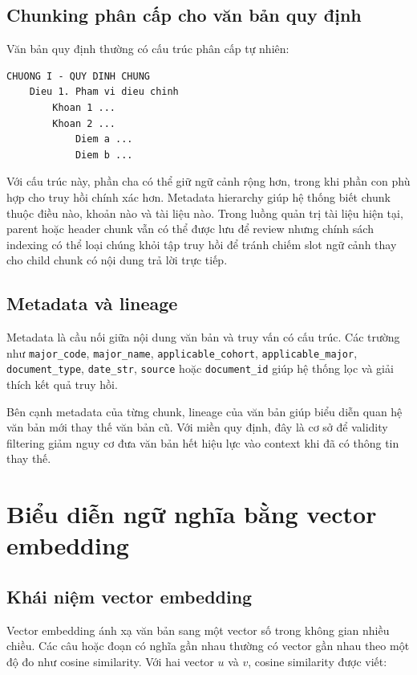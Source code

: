 \documentclass[../DoAn.tex]{subfiles}
\begin{document}
\subsection{Chunking phân cấp cho văn bản quy định}

Văn bản quy định thường có cấu trúc phân cấp tự nhiên:

\begin{verbatim}
CHUONG I - QUY DINH CHUNG
    Dieu 1. Pham vi dieu chinh
        Khoan 1 ...
        Khoan 2 ...
            Diem a ...
            Diem b ...
\end{verbatim}

Với cấu trúc này, phần cha có thể giữ ngữ cảnh rộng hơn, trong khi phần con phù
hợp cho truy hồi chính xác hơn. Metadata hierarchy giúp hệ thống biết chunk thuộc
điều nào, khoản nào và tài liệu nào. Trong luồng quản trị tài liệu hiện tại,
parent hoặc header chunk vẫn có thể được lưu để review nhưng chính sách indexing
có thể loại chúng khỏi tập truy hồi để tránh chiếm slot ngữ cảnh thay cho child
chunk có nội dung trả lời trực tiếp.

\subsection{Metadata và lineage}

Metadata là cầu nối giữa nội dung văn bản và truy vấn có cấu trúc. Các trường như
\texttt{major\_code}, \texttt{major\_name}, \texttt{applicable\_cohort},
\texttt{applicable\_major}, \texttt{document\_type}, \texttt{date\_str},
\texttt{source} hoặc \texttt{document\_id} giúp hệ thống lọc và giải thích kết
quả truy hồi.

Bên cạnh metadata của từng chunk, lineage của văn bản giúp biểu diễn quan hệ văn
bản mới thay thế văn bản cũ. Với miền quy định, đây là cơ sở để validity filtering
giảm nguy cơ đưa văn bản hết hiệu lực vào context khi đã có thông tin thay thế.

\section{Biểu diễn ngữ nghĩa bằng vector embedding}

\subsection{Khái niệm vector embedding}

Vector embedding ánh xạ văn bản sang một vector số trong không gian nhiều chiều.
Các câu hoặc đoạn có nghĩa gần nhau thường có vector gần nhau theo một độ đo như
cosine similarity. Với hai vector $u$ và $v$, cosine similarity được viết:
\end{document}
